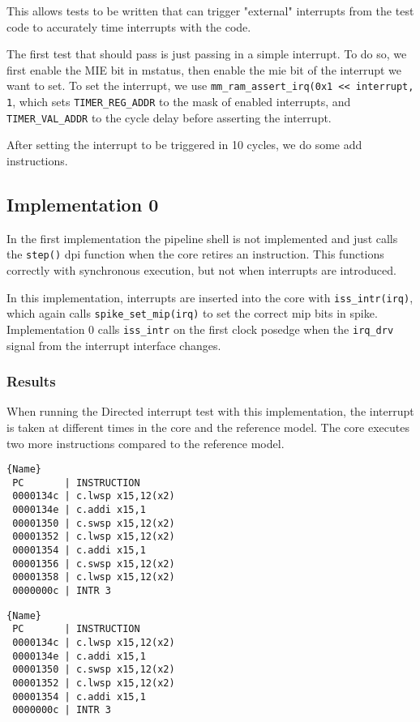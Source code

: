 This allows tests to be written that can trigger "external" interrupts from the test code to accurately time interrupts with the code.

The first test that should pass is just passing in a simple interrupt. To do so, we first enable the MIE bit in mstatus, then enable the mie bit of the interrupt we want to set. To set the interrupt, we use \lstinline{mm_ram_assert_irq(0x1 << interrupt, 1}, which sets \lstinline{TIMER_REG_ADDR} to the mask of enabled interrupts, and \lstinline{TIMER_VAL_ADDR} to the cycle delay before asserting the interrupt.

After setting the interrupt to be triggered in 10 cycles, we do some add instructions.




\subsection{Implementation 0}

In the first implementation the pipeline shell is not implemented and just calls the \lstinline{step()} dpi function when the core retires an instruction. This functions correctly with synchronous execution, but not when interrupts are introduced. 

In this implementation, interrupts are inserted into the core with \lstinline{iss_intr(irq)}, which again calls \lstinline{spike_set_mip(irq)} to set the correct mip bits in spike. 
Implementation 0 calls \lstinline{iss_intr} on the first clock posedge when the \lstinline{irq_drv} signal from the interrupt interface changes.

\subsubsection{Results}

When running the Directed interrupt test with this implementation, the interrupt is taken at different times in the core and the reference model. The core executes two more instructions compared to the reference model. 


\begin{minipage}{.45\textwidth}
\vspace*{0pt}
\begin{lstlisting}[caption=Core,frame=tlrb]{Name}
 PC       | INSTRUCTION
 0000134c | c.lwsp x15,12(x2)
 0000134e | c.addi x15,1
 00001350 | c.swsp x15,12(x2)
 00001352 | c.lwsp x15,12(x2)
 00001354 | c.addi x15,1
 00001356 | c.swsp x15,12(x2)
 00001358 | c.lwsp x15,12(x2)
 0000000c | INTR 3
\end{lstlisting}
\end{minipage}\hfill
\begin{minipage}{.45\textwidth}
\vspace*{0pt}
\begin{lstlisting}[caption=RM,frame=tlrb]{Name}
 PC       | INSTRUCTION
 0000134c | c.lwsp x15,12(x2)
 0000134e | c.addi x15,1
 00001350 | c.swsp x15,12(x2)
 00001352 | c.lwsp x15,12(x2)
 00001354 | c.addi x15,1
 0000000c | INTR 3
\end{lstlisting}
\end{minipage}



